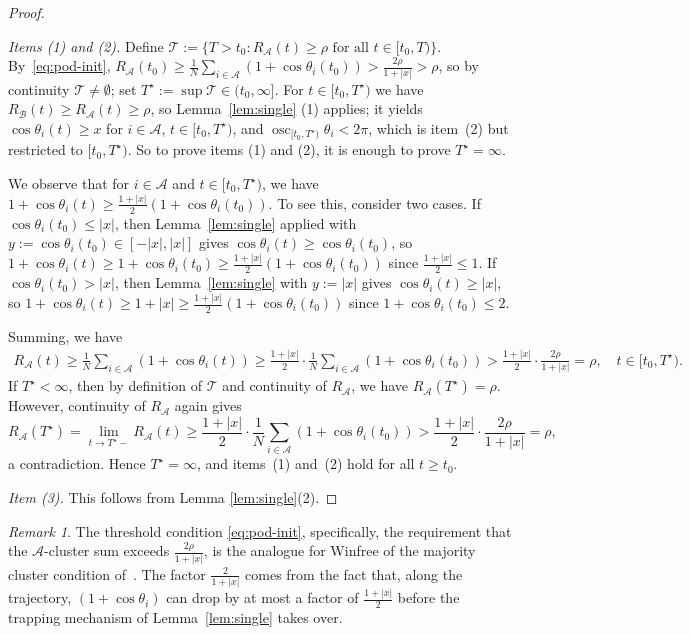 \documentclass[11pt,reqno]{amsart}
\newcounter{name}
\theoremstyle{definition}
\theoremstyle{remark}
\newtheorem{remark}[lemma]{Remark}
\begin{document}
\begin{proof}
	\,
	
\emph{Items (1) and (2).} Define
$\mathcal T:=\{T>t_0\colon R_\mathcal{A}(t)\ge\rho\text{ for all }t\in[t_0,T)\}$.
By~\eqref{eq:pod-init},
$R_\mathcal{A}(t_0)\ge\frac1N\sum_{i\in\mathcal A}(1+\cos\theta_i(t_0))>\frac{2\rho}{1+|x|}>\rho$,
so by continuity $\mathcal T\ne\emptyset$; set $T^\star:=\sup\mathcal T\in(t_0,\infty]$.
For $t\in[t_0,T^\star)$ we have $R_\mathcal{B}(t)\ge R_\mathcal{A}(t)\ge\rho$, so
Lemma~\ref{lem:single} (1) applies; it yields
$\cos\theta_i(t)\ge x$ for $i\in\mathcal A$, $t\in[t_0,T^\star)$, and $\operatorname{osc}_{[t_0,T^\star)}\theta_i<2\pi$, which
is item~(2) but restricted to $[t_0,T^\star)$. So to prove items (1) and (2), it is enough to prove $T^\star=\infty$.

We observe that for $i\in \mathcal{A}$ and $t\in [t_0,T^\star)$, we have
$1+\cos\theta_i(t)\ge\frac{1+|x|}{2}(1+\cos\theta_i(t_0))$.
To see this, consider two cases.
If $\cos\theta_i(t_0)\le|x|$, then
Lemma~\ref{lem:single} applied with $y:=\cos\theta_i(t_0)\in[-|x|,|x|]$
gives $\cos\theta_i(t)\ge\cos\theta_i(t_0)$, so
$1+\cos\theta_i(t)\ge 1+\cos\theta_i(t_0)\ge\frac{1+|x|}{2}(1+\cos\theta_i(t_0))$
since $\frac{1+|x|}{2}\le 1$.
If $\cos\theta_i(t_0)>|x|$, then Lemma~\ref{lem:single} with $y:=|x|$
gives $\cos\theta_i(t)\ge|x|$, so
$1+\cos\theta_i(t)\ge 1+|x|\ge\frac{1+|x|}{2}(1+\cos\theta_i(t_0))$
since $1+\cos\theta_i(t_0)\le 2$.

Summing, we have
\begin{align*}
R_\mathcal{A}(t)\ge\frac1N\sum_{i\in\mathcal A}(1+\cos\theta_i(t))\ge\frac{1+|x|}{2}\cdot\frac1N\sum_{i\in\mathcal{A}}(1+\cos\theta_i(t_0))>\frac{1+|x|}{2}\cdot\frac{2\rho}{1+|x|}=\rho,\quad t\in [t_0,T^\star).
\end{align*}
If $T^\star<\infty$, then by definition of $\mathcal{T}$ and continuity of $R_\mathcal{A}$, we have $R_\mathcal{A}(T^\star)=\rho$. However, continuity of $R_\mathcal{A}$ again gives
\[
R_\mathcal{A}(T^\star)=\lim_{t\to T^\star -}R_\mathcal{A}(t)\ge \frac{1+|x|}{2}\cdot\frac1N\sum_{i\in\mathcal A}(1+\cos\theta_i(t_0))>\frac{1+|x|}{2}\cdot\frac{2\rho}{1+|x|}=\rho,
\]
a contradiction. Hence
$T^\star=\infty$, and items~(1) and~(2) hold for all $t\ge t_0$.


\smallskip
\emph{Item (3).} This follows from Lemma \ref{lem:single}(2).


\end{proof}

\begin{remark}
The threshold condition \eqref{eq:pod-init}, specifically, the
requirement that the $\mathcal A$-cluster sum exceeds
$\tfrac{2\rho}{1+|x|}$, is the analogue for Winfree of the majority
cluster condition of~\cite[Theorem~4.1]{cho2025quantitative}.
The factor $\tfrac{2}{1+|x|}$ comes from the fact that, along the
trajectory, $(1+\cos\theta_i)$ can drop by at most a factor of
$\tfrac{1+|x|}2$ before the trapping mechanism of
Lemma~\ref{lem:single} takes over.
\end{remark}
\end{document}
